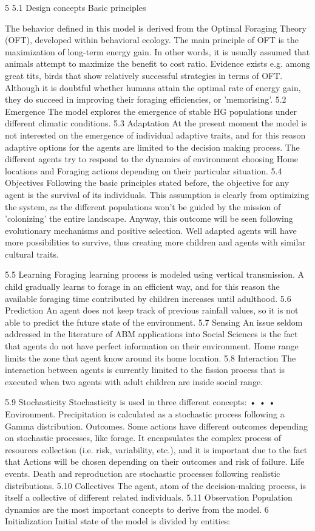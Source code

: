 5
5.1
Design concepts
Basic principles

The behavior defined in this model is derived from the Optimal Foraging Theory (OFT), developed
within behavioral ecology. The main principle of OFT is the maximization of long-term energy gain. In
other words, it is usually assumed that animals attempt to maximize the benefit to cost ratio. Evidence
exists e.g. among great tits, birds that show relatively successful strategies in terms of OFT. Although it
is doubtful whether humans attain the optimal rate of energy gain, they do succeed in improving their
foraging efficiencies, or 'memorising'.
5.2 Emergence
The model explores the emergence of stable HG populations under different climatic conditions.
5.3 Adaptation
At the present moment the model is not interested on the emergence of individual adaptive traits, and
for this reason adaptive options for the agents are limited to the decision making process. The different
agents try to respond to the dynamics of environment choosing Home locations and Foraging actions
depending on their particular situation.
5.4 Objectives
Following the basic principles stated before, the objective for any agent is the survival of its individuals.
This assumption is clearly from optimizing the system, as the different populations won't be guided by
the mission of 'colonizing' the entire landscape. Anyway, this outcome will be seen following
evolutionary mechanisms and positive selection. Well adapted agents will have more possibilities to
survive, thus creating more children and agents with similar cultural traits.

5.5 Learning
Foraging learning process is modeled using vertical transmission. A child gradually learns to forage in
an efficient way, and for this reason the available foraging time contributed by children increases until
adulthood.
5.6 Prediction
An agent does not keep track of previous rainfall values, so it is not able to predict the future state of
the environment.
5.7 Sensing
An issue seldom addressed in the literature of ABM applications into Social Sciences is the fact that
agents do not have perfect information on their environment. Home range limits the zone that agent
know around its home location.
5.8 Interaction
The interaction between agents is currently limited to the fission process that is executed when two
agents with adult children are inside social range.

5.9 Stochasticity
Stochasticity is used in three different concepts:
•
•
•
Environment. Precipitation is calculated as a stochastic process following a Gamma
distribution.
Outcomes. Some actions have different outcomes depending on stochastic processes, like
forage. It encapsulates the complex process of resources collection (i.e. risk, variability, etc.),
and it is important due to the fact that Actions will be chosen depending on their outcomes and
risk of failure.
Life events. Death and reproduction are stochastic processes following realistic distributions.
5.10 Collectives
The agent, atom of the decision-making process, is itself a collective of different related individuals.
5.11 Observation
Population dynamics are the most important concepts to derive from the model.
6
Initialization
Initial state of the model is divided by entities:

